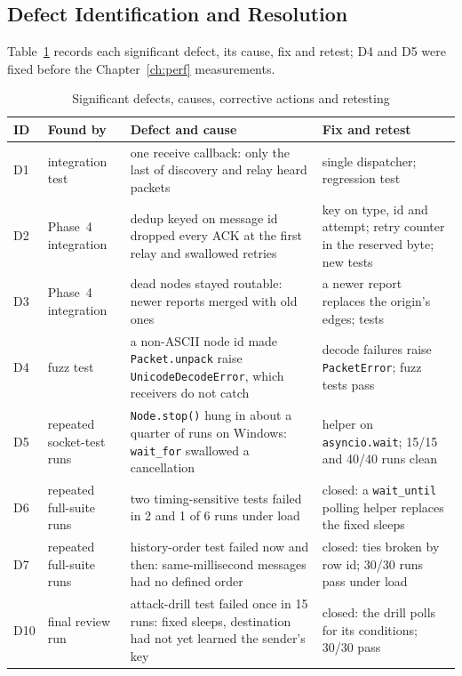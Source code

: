 \subsection{Defect Identification and Resolution}
\label{sec:defects}
Table~\ref{tab:defects} records each significant defect, its cause, fix and retest; D4 and D5 were fixed before the Chapter~\ref{ch:perf} measurements.
\begin{table}[!htbp]
\caption{Significant defects, causes, corrective actions and retesting}
\label{tab:defects}
\scriptsize
\begin{tabularx}{\textwidth}{@{}>{\raggedright\arraybackslash}p{0.6cm}>{\raggedright\arraybackslash}p{2.6cm}>{\raggedright\arraybackslash}X>{\raggedright\arraybackslash}p{5.2cm}@{}}
\toprule
\textbf{ID} & \textbf{Found by} & \textbf{Defect and cause} & \textbf{Fix and retest}\\ \midrule
D1 & integration test & one receive callback: only the last of discovery and relay heard packets & single dispatcher; regression test\\
D2 & Phase~4 integration & dedup keyed on message id dropped every ACK at the first relay and swallowed retries & key on type, id and attempt; retry counter in the reserved byte; new tests\\
D3 & Phase~4 integration & dead nodes stayed routable: newer reports merged with old ones & a newer report replaces the origin's edges; tests\\
D4 & fuzz test & a non-ASCII node id made \texttt{Packet.unpack} raise \texttt{UnicodeDecodeError}, which receivers do not catch & decode failures raise \texttt{PacketError}; fuzz tests pass\\
D5 & repeated socket-test runs & \texttt{Node.stop()} hung in about a quarter of runs on Windows: \texttt{wait\_for} swallowed a cancellation & helper on \texttt{asyncio.wait}; 15/15 and 40/40 runs clean\\
D6 & repeated full-suite runs & two timing-sensitive tests failed in 2 and 1 of 6 runs under load & closed: a \texttt{wait\_until} polling helper replaces the fixed sleeps\\
D7 & repeated full-suite runs & history-order test failed now and then: same-millisecond messages had no defined order & closed: ties broken by row id; 30/30 runs pass under load\\
D10 & final review run & attack-drill test failed once in 15 runs: fixed sleeps, destination had not yet learned the sender's key & closed: the drill polls for its conditions; 30/30 pass\\
\bottomrule
\end{tabularx}
\end{table}

